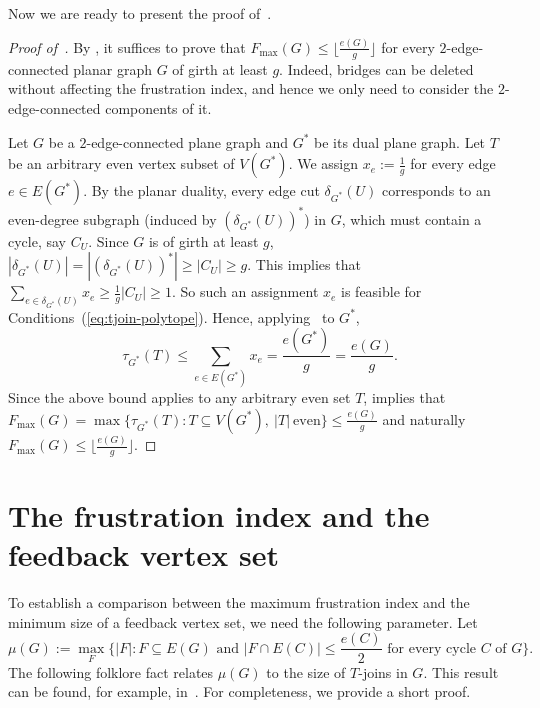 \documentclass[a4paper,12pt]{article}
\theoremstyle{plain}
\theoremstyle{definition}
\theoremstyle{remark}
\numberwithin{equation}{section}
\newcommand{\abs}[1]{\lvert#1\rvert}
\begin{document}
Now we are ready to present the proof of~.

\begin{proof}[Proof of~]
By , it suffices to prove that $F_{\max}(G)\leq \lfloor \frac{e(G)}{g}\rfloor$ for every $2$-edge-connected planar graph $G$ of girth at least $g$. Indeed, bridges can be deleted without affecting the frustration index, and hence we only need to consider the $2$-edge-connected components of it.

Let $G$ be a $2$-edge-connected plane graph and $G^*$ be its dual plane graph. Let $T$ be an arbitrary even vertex subset of $V(G^*)$. We assign $x_e:=\frac{1}{g}$ for every edge $e\in E(G^*)$. By the planar duality, every edge cut $\delta_{G^*}(U)$ corresponds to an even-degree subgraph (induced by $(\delta_{G^*}(U))^*$) in $G$, which must contain a cycle, say $C_U$. Since $G$ is of girth at least $g$, $|\delta_{G^*}(U)|=|(\delta_{G^*}(U))^*|\geq |C_U|\geq g$. This implies that $\sum\limits_{e\in \delta_{G^*}(U)} x_e\geq \frac{1}{g}|C_U|\ge 1$. So such an assignment $x_e$ is feasible for Conditions~(\ref{eq:tjoin-polytope}). Hence, applying~ to $G^*$, $$\tau_{G^*}(T)\le \sum_{e\in E(G^*)}x_e=\frac{e(G^*)}{g}=\frac{e(G)}{g}.$$ Since the above bound applies to any arbitrary even set $T$,  implies that $F_{\max}(G)=\max\{\tau_{G^*}(T): T\subseteq V(G^*), ~|T|~\text{even} \}\le \frac{e(G)}{g}$ and naturally $F_{\max}(G)\leq \lfloor \frac{e(G)}{g}\rfloor$. 
\end{proof}



\section{The frustration index and the feedback vertex set}\label{sec:fvs}

To establish a comparison between the maximum frustration index and the minimum size of a feedback vertex set, we need the following parameter. Let $$\mu(G):=\max\limits_{F}\{\abs{F}:F\subseteq E(G)\text{ and $\abs{F\cap E(C)}\le \frac{e(C)}{2}$ for every cycle $C$ of $G$}\}.$$
The following folklore fact relates $\mu(G)$ to the size of $T$-joins in $G$. This result can be found, for example, in~\cite{K1962}. For completeness, we provide a short proof.
\end{document}
